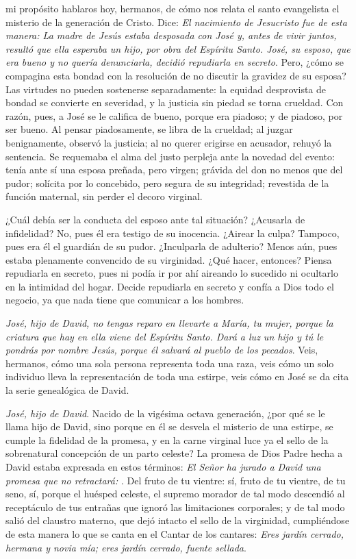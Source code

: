 \begin{body}
	 mi propósito hablaros hoy, hermanos, de cómo nos relata el santo evangelista el misterio de la generación de Cristo. Dice: \emph{El nacimiento de Jesucristo fue de esta manera: La madre de Jesús estaba desposada con José y, antes de vivir juntos, resultó que ella esperaba un hijo, por obra del Espíritu Santo. José, su esposo, que era bueno y no quería denunciarla, decidió repudiarla en secreto}. Pero, ¿cómo se compagina esta bondad con la resolución de no discutir la gravidez de su esposa? Las virtudes no pueden sostenerse separadamente: la equidad desprovista de bondad se convierte en severidad, y la justicia sin piedad se torna crueldad. Con razón, pues, a José se le califica de bueno, porque era piadoso; y de piadoso, por ser bueno. Al pensar piadosamente, se libra de la crueldad; al juzgar benignamente, observó la justicia; al no querer erigirse en acusador, rehuyó la sentencia. Se requemaba el alma del justo perpleja ante la novedad del evento: tenía ante sí una esposa preñada, pero virgen; grávida del don no menos que del pudor; solícita por lo concebido, pero segura de su integridad; revestida de la función maternal, sin perder el decoro virginal.
	
	¿Cuál debía ser la conducta del esposo ante tal situación? ¿Acusarla de infidelidad? No, pues él era testigo de su inocencia. ¿Airear la culpa? Tampoco, pues era él el guardián de su pudor. ¿Inculparla de adulterio? Menos aún, pues estaba plenamente convencido de su virginidad. ¿Qué hacer, entonces? Piensa repudiarla en secreto, pues ni podía ir por ahí aireando lo sucedido ni ocultarlo en la intimidad del hogar. Decide repudiarla en secreto y confía a Dios todo el negocio, ya que nada tiene que comunicar a los hombres.
	
	\emph{José, hijo de David, no tengas reparo en llevarte a María, tu mujer, porque la criatura que hay en ella viene del Espíritu Santo. Dará a luz un hijo y tú le pondrás por nombre Jesús, porque él salvará al pueblo de los pecados}. Veis, hermanos, cómo una sola persona representa toda una raza, veis cómo un solo individuo lleva la representación de toda una estirpe, veis cómo en José se da cita la serie genealógica de David.
	
	\emph{José, hijo de David}. Nacido de la vigésima octava generación, ¿por qué se le llama hijo de David, sino porque en él se desvela el misterio de una estirpe, se cumple la fidelidad de la promesa, y en la carne virginal luce ya el sello de la sobrenatural concepción de un parto celeste? La promesa de Dios Padre hecha a David estaba expresada en estos términos: \emph{El Señor ha jurado a David una promesa que no retractará: }. Del fruto de tu vientre: sí, fruto de tu vientre, de tu seno, sí, porque el huésped celeste, el supremo morador de tal modo descendió al receptáculo de tus entrañas que ignoró las limitaciones corporales; y de tal modo salió del claustro materno, que dejó intacto el sello de la virginidad, cumpliéndose de esta manera lo que se canta en el Cantar de los cantares: \emph{Eres jardín cerrado, hermana y novia mía; eres jardín cerrado, fuente sellada}.
	

\end{body}
